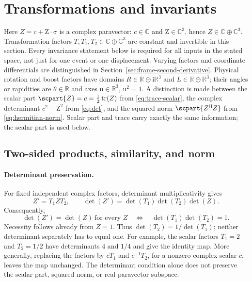 \documentclass[11pt]{article}
\newcommand{\pv}[1]{{#1}}
\newcommand{\vstyle}[1]{{\bm{\mathrm{#1}}}}
\newcommand{\pL}{\pv{L}}
\newcommand{\pR}{\pv{R}}
\newcommand{\pT}{\pv{T}}
\newcommand{\pZ}{\pv{Z}}
\numberwithin{equation}{section}
\newcommand{\R}{\mathbb{R}}
\newcommand{\C}{\mathbb{C}}
\newcommand{\ii}{\mathrm{i}}
\newcommand{\dotprod}{\cdot}
\newcommand{\bsig}{\vstyle{\sigma}}
\newcommand{\bZ}{\vstyle{Z}}
\newcommand{\bu}{\vstyle{u}}
\begin{document}
\section{Transformations and invariants}
\label{sec:preserved-quantities}

Here $\pZ=c+\bZ\dotprod\bsig$ is a complex paravector: $c\in\C$ and
$\bZ\in\C^3$, hence $\pZ\in\C\oplus\C^3$.
Transformation factors $\pT,\pT_1,\pT_2\in\C\oplus\C^3$ are constant
and invertible in this section. Every invariance statement below is
required for all inputs in the stated space, not just for one event
or one displacement. Varying factors and coordinate differentials are
distinguished in Section~\ref{sec:frame-second-derivative}.
Physical rotation and boost factors have domains
$\pR\in\R\oplus\ii\R^3$ and $\pL\in\R\oplus\R^3$;
their angles or rapidities are $\theta\in\R$ and axes $\bu\in\R^3$,
$\bu^2=1$.
A distinction is made between the scalar part $\scpart {\pZ}=c=\tfrac12\operatorname{tr}(\pZ)$
from \eqref{eq:trace-scalar}, the complex determinant $c^2-\bZ^2$ from
\eqref{eq:det}, and the squared norm $\scpart{\pZ^{\mathsf H}\pZ}$ from
\eqref{eq:hermitian-norm}.  Scalar part and trace carry exactly the same
information; the scalar part is used below.

\subsection{Two-sided products, similarity, and norm}
\label{sec:two-sided-invariants}

\paragraph{Determinant preservation.}
For fixed independent complex factors, determinant multiplicativity gives
\[
 \pZ'=\pT_1\pZ\pT_2,\qquad
 \det(\pZ')=\det(\pT_1)\det(\pT_2)\det(\pZ).
\]
Consequently,
\begin{equation}
 \boxed{\det(\pZ')=\det(\pZ)\ \text{for every }\pZ
 \quad\Longleftrightarrow\quad
 \det(\pT_1)\det(\pT_2)=1.}
 \label{eq:two-sided-determinant-condition}
\end{equation}
Necessity follows already from $\pZ=1$. Thus
$\det(\pT_2)=1/\det(\pT_1)$; neither determinant separately has to
equal one. For example, the scalar factors $\pT_1=2$ and
$\pT_2=1/2$ have determinants $4$ and $1/4$ and give the identity
map. More generally, replacing the factors by $c\pT_1$ and
$c^{-1}\pT_2$, for a nonzero complex scalar $c$, leaves the map
unchanged. The determinant condition alone does not preserve the
scalar part, squared norm, or real paravector subspace.
\end{document}
